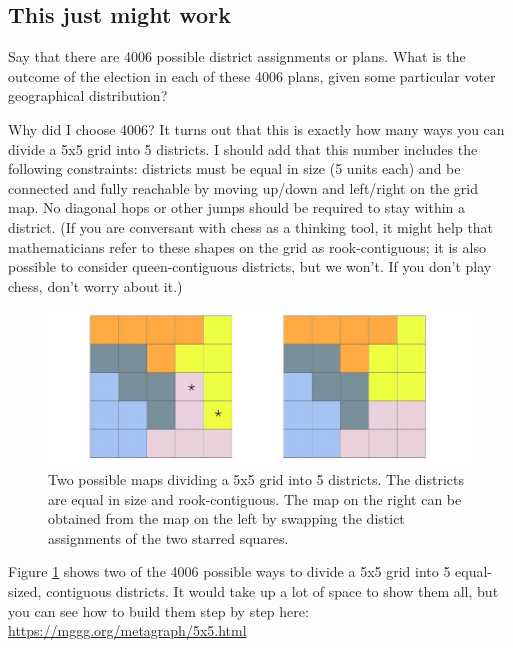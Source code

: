 \documentclass[
  openany]{book}
\begin{document}
\hypertarget{this-just-might-work}{%
\subsection*{This just might work}\label{this-just-might-work}}

Say that there are 4006 possible district assignments or plans. What is the outcome of the election in each of these 4006 plans, given some particular voter geographical distribution?

Why did I choose 4006? It turns out that this is exactly how many ways you can divide a 5x5 grid into 5 districts. I should add that this number includes the following constraints: districts must be equal in size (5 units each) and be connected and fully reachable by moving up/down and left/right on the grid map. No diagonal hops or other jumps should be required to stay within a district. (If you are conversant with chess as a thinking tool, it might help that mathematicians refer to these shapes on the grid as rook-contiguous; it is also possible to consider queen-contiguous districts, but we won't. If you don't play chess, don't worry about it.)

\begin{figure}

{\centering \includegraphics[width=0.8\linewidth]{images/gerrymandering5x5_1} 

}

\caption{Two possible maps dividing a 5x5 grid into 5 districts. The districts are equal in size and rook-contiguous. The map on the right can be obtained from the map on the left by swapping the distict assignments of the two starred squares.}\label{fig:gerrymandering-5x5-1}
\end{figure}

Figure \ref{fig:gerrymandering-5x5-1} shows two of the 4006 possible ways to divide a 5x5 grid into 5 equal-sized, contiguous districts. It would take up a lot of space to show them all, but you can see how to build them step by step here: \url{https://mggg.org/metagraph/5x5.html}
\end{document}
